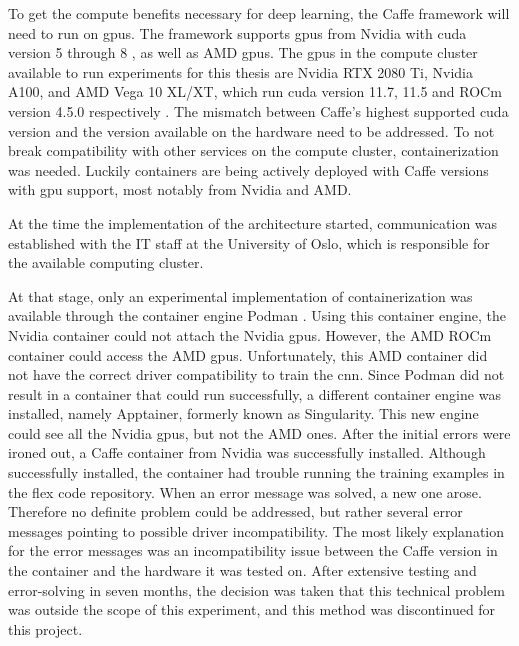             To get the compute benefits necessary for deep learning, the Caffe framework will need to run on \glspl{gpu}.
            The framework supports \glspl{gpu} from Nvidia with \gls{cuda} version 5 through 8 \cite{CaffeInstallation, CaffeDeepLearning}, as well as AMD \glspl{gpu}. The \glspl{gpu} in the compute cluster available to run experiments for this thesis are Nvidia RTX 2080 Ti, Nvidia A100, and AMD Vega 10 XL/XT, which run \gls{cuda} version 11.7, 11.5 and ROCm version 4.5.0 respectively \cite{MLNodesUniversitetet}. 
            The mismatch between Caffe's highest supported \gls{cuda} version and the version available on the hardware need to be addressed.
            To not break compatibility with other services on the compute cluster, containerization was needed. Luckily containers are being actively deployed with  Caffe versions with \gls{gpu} support, most notably from Nvidia and AMD.


            At the time the implementation of the architecture started, communication was established with the IT staff at the University of Oslo, which is responsible for the available computing cluster.
            
            At that stage, only an experimental implementation of containerization was available through the container engine Podman \cite{Podman}. Using this container engine, the Nvidia container could not attach the Nvidia \glspl{gpu}. However, the AMD ROCm container could access the AMD \glspl{gpu}. Unfortunately, this AMD container did not have the correct driver compatibility to train the \gls{cnn}. Since Podman did not result in a container that could run successfully, a different container engine was installed, namely Apptainer, formerly known as Singularity. This new engine could see all the Nvidia \glspl{gpu}, but not the AMD ones. After the initial errors were ironed out, a Caffe container from Nvidia was successfully installed. Although successfully installed, the container had trouble running the training examples in the \gls{flex} code repository. 
            When an error message was solved, a new one arose.
            Therefore no definite problem could be addressed, but rather several error messages pointing to possible driver incompatibility. 
            The most likely explanation for the error messages was an incompatibility issue between the Caffe version in the container and the hardware it was tested on. After extensive testing and error-solving in seven months, the decision was taken that this technical problem was outside the scope of this experiment, and this method was discontinued for this project. 
            
